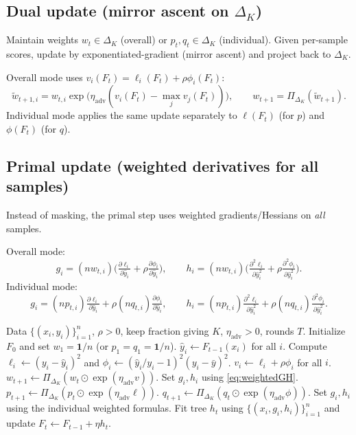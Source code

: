 \documentclass[11pt]{article}
\newcommand{\yh}{\hat y}
\newcommand{\one}{\mathbf{1}}
\theoremstyle{plain}
\theoremstyle{definition}
\newcommand{\1}{\mathbf{1}}
\begin{document}
\subsection{Dual update (mirror ascent on $\Delta_K$)}
Maintain weights $w_t\in\Delta_K$ (overall) or $p_t,q_t\in\Delta_K$ (individual). Given per-sample scores, update by exponentiated-gradient (mirror ascent) and project back to $\Delta_K$.

Overall mode uses $v_i(F_t)=\ell_i(F_t)+\rho\phi_i(F_t)$:
\begin{equation}
\tilde w_{t+1,i} = w_{t,i}\exp\big(\eta_{\text{adv}}(v_i(F_t)-\max_{j} v_j(F_t))\big),
\qquad
w_{t+1} = \Pi_{\Delta_K}(\tilde w_{t+1}).
\label{eq:mirror}
\end{equation}
Individual mode applies the same update separately to $\ell(F_t)$ (for $p$) and $\phi(F_t)$ (for $q$).

\subsection{Primal update (weighted derivatives for all samples)}
Instead of masking, the primal step uses weighted gradients/Hessians on \emph{all} samples.

Overall mode:
\begin{equation}
g_i = (n w_{t,i})\Big(\tfrac{\partial \ell_i}{\partial \yh_i} + \rho\tfrac{\partial \phi_i}{\partial \yh_i}\Big),
\qquad
h_i = (n w_{t,i})\Big(\tfrac{\partial^2 \ell_i}{\partial \yh_i^2} + \rho\tfrac{\partial^2 \phi_i}{\partial \yh_i^2}\Big).
\label{eq:weightedGH}
\end{equation}
Individual mode:
\begin{equation}
g_i = (n p_{t,i})\tfrac{\partial \ell_i}{\partial \yh_i} + \rho (n q_{t,i})\tfrac{\partial \phi_i}{\partial \yh_i},
\qquad
h_i = (n p_{t,i})\tfrac{\partial^2 \ell_i}{\partial \yh_i^2} + \rho (n q_{t,i})\tfrac{\partial^2 \phi_i}{\partial \yh_i^2}.
\end{equation}

\begin{algorithm}[t]
\caption{Primal--dual robust boosting with mirror-ascent adversary (sketch)}
\label{alg:pd}
\begin{algorithmic}[1]
\Require Data $\{(x_i,y_i)\}_{i=1}^n$, $\rho>0$, keep fraction giving $K$, $\eta_{\text{adv}}>0$, rounds $T$.
\State Initialize $F_0$ and set $w_1=\one/n$ (or $p_1=q_1=\one/n$).
\State $\yh_i \gets F_{t-1}(x_i)$ for all $i$.
\State Compute $\ell_i \gets (y_i-\yh_i)^2$ and $\phi_i \gets (\yh_i/y_i-1)^2(y_i-\bar y)^2$.
\State $v_i \gets \ell_i + \rho\phi_i$ for all $i$.
\State $w_{t+1} \gets \Pi_{\Delta_K}(w_t\odot \exp(\eta_{\text{adv}} v))$.
\State Set $g_i,h_i$ using \eqref{eq:weightedGH}.
\Else {}
\State $p_{t+1} \gets \Pi_{\Delta_K}(p_t\odot \exp(\eta_{\text{adv}} \ell))$.
\State $q_{t+1} \gets \Pi_{\Delta_K}(q_t\odot \exp(\eta_{\text{adv}} \phi))$.
\State Set $g_i,h_i$ using the individual weighted formulas.
\EndIf
\State Fit tree $h_t$ using $\{(x_i,g_i,h_i)\}_{i=1}^n$ and update $F_t \gets F_{t-1} + \eta h_t$.
\EndFor
\end{algorithmic}
\end{algorithm}
\end{document}

